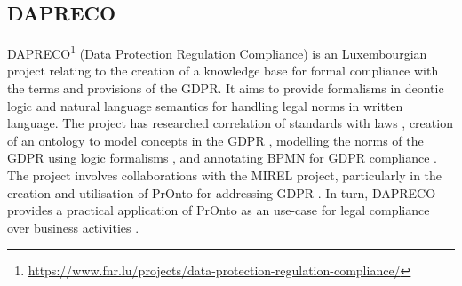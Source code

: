 \subsection*{DAPRECO}\label{sec:sota:DAPRECO}
DAPRECO\footnote{\url{https://www.fnr.lu/projects/data-protection-regulation-compliance/}} (Data Protection Regulation Compliance) is an Luxembourgian project relating to the creation of a knowledge base for formal compliance with the terms and provisions of the GDPR. It aims to provide formalisms in deontic logic and natural language semantics for handling legal norms in written language. The project has researched correlation of standards with laws \cite{bartolini_towards_2016}, creation of an ontology to model concepts in the GDPR \cite{otake_using_2017}, modelling the norms of the GDPR using logic formalisms \cite{bartolini_legal_2018}, and annotating BPMN for GDPR compliance \cite{bartolini_enhancing_2019}.
The project involves collaborations with the MIREL project, particularly in the creation and utilisation of PrOnto for addressing GDPR \cite{monica_legal_2018,palmirani_pronto_2018,palmirani_pronto_compliance_2018,bartolini_enhancing_2019}. In turn, DAPRECO provides a practical application of PrOnto as an use-case for legal compliance over business activities \cite{bartolini_enhancing_2019,bartolini_agile_2019}.

